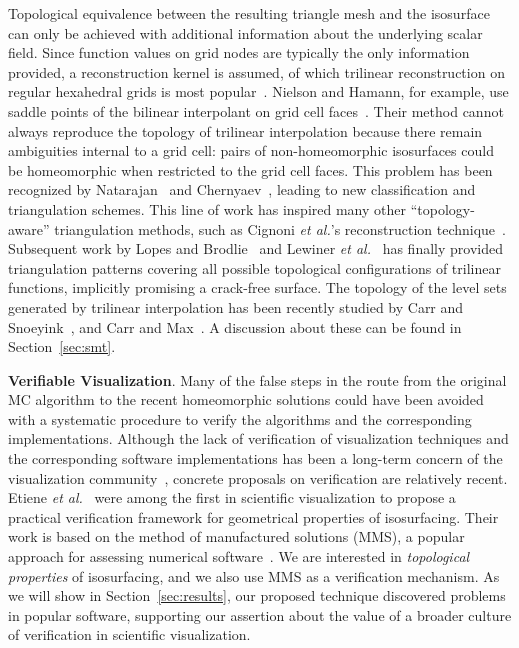 Topological equivalence between the resulting triangle mesh and the isosurface
can only be achieved with additional information about the underlying
scalar field.
%
Since function values on grid nodes are typically the only information
provided, a reconstruction kernel is assumed, of which trilinear
reconstruction on regular hexahedral grids is most
popular~\cite{Nielson03onmarching}.
%
Nielson and
Hamann, for example,
use saddle points of the bilinear
interpolant on grid cell faces~\cite{Nielson:1991:ADR:949607.949621}. 
%
Their method cannot always reproduce the
topology of trilinear interpolation because there remain  ambiguities
internal to a grid cell: pairs of non-homeomorphic isosurfaces could
be homeomorphic when restricted to the grid cell faces.
%
This problem has been recognized by Natarajan~\cite{Natarajan:1994:GTC:205424.205429} and 
Chernyaev~\cite{Chernyaev95marchingcubes}, leading to new classification and
triangulation schemes.
%
This line of work has inspired many other ``topology-aware'' triangulation
methods,
such as Cignoni \emph{et al.}'s reconstruction
technique~\cite{Cignoni00reconstructionof}.
%
Subsequent work by Lopes and Brodlie~\cite{lopes:tvcg:2003} and
Lewiner \emph{et al.}~\cite{Lewiner:2003} has finally provided triangulation patterns covering
all possible topological configurations of trilinear functions, implicitly promising
a crack-free surface.
%
The topology of the level sets generated by trilinear interpolation
has been recently studied by Carr and Snoeyink~\cite{CS08}, and Carr
and Max~\cite{10.1109/TVCG.2009.10}. A discussion about these can be found in
Section~\ref{sec:smt}.

\textbf{Verifiable Visualization}.
Many of the false steps in the route from the
original MC algorithm to the recent homeomorphic solutions
could have been avoided with a systematic procedure to verify the
algorithms and the corresponding implementations. 
%
Although the lack of verification of visualization techniques and the
corresponding software implementations has been a long-term concern of
the visualization community~\cite{globus95,kirby-vv-08}, concrete
proposals on verification are relatively recent.
%
Etiene \emph{et al.}~\cite{etiene:tvcg:2009} were among the first
in scientific visualization to propose a practical
verification framework for geometrical properties of isosurfacing.
Their work is
based on the method of manufactured solutions (MMS),
a popular approach for assessing numerical software~\cite{babuska04}. 
We are interested in \emph{topological properties} of
isosurfacing, and we also use MMS as a
verification mechanism. As we will show in Section~\ref{sec:results}, our proposed
technique discovered problems in popular software,
supporting our assertion about the value of a
broader culture of verification in scientific visualization.

